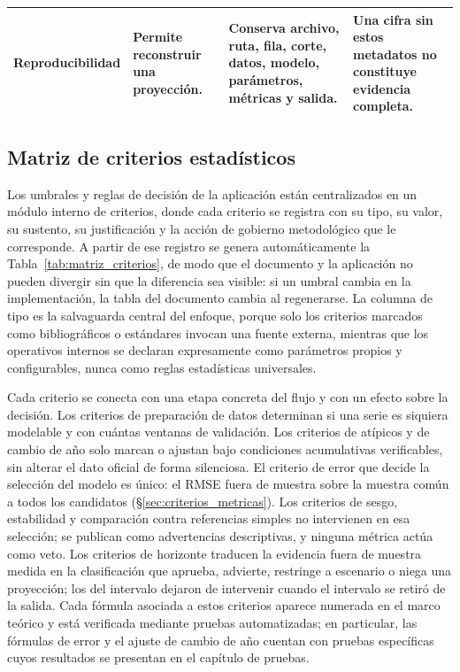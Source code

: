 \documentclass[12pt,letterpaper]{article}
\begin{document}
\begin{landscape}
\begin{table}[H]
\begin{adjustbox}{max width=\linewidth,max totalheight=0.84\textheight}
\begin{tabularx}{\linewidth}{@{}p{3.1cm}YYY@{}}
Reproducibilidad & Permite reconstruir una proyección. & Conserva archivo, ruta, fila, corte, datos, modelo, parámetros, métricas y salida. & Una cifra sin estos metadatos no constituye evidencia completa. \\
\bottomrule
\end{tabularx}
\end{adjustbox}
\end{table}
\end{landscape}

\subsection{Matriz de criterios estadísticos}
\label{sec:matriz_criterios}

Los umbrales y reglas de decisión de la aplicación están centralizados en un módulo interno de criterios, donde cada criterio se registra con su tipo, su valor, su sustento, su justificación y la acción de gobierno metodológico que le corresponde. A partir de ese registro se genera automáticamente la Tabla~\ref{tab:matriz_criterios}, de modo que el documento y la aplicación no pueden divergir sin que la diferencia sea visible: si un umbral cambia en la implementación, la tabla del documento cambia al regenerarse. La columna de tipo es la salvaguarda central del enfoque, porque solo los criterios marcados como bibliográficos o estándares invocan una fuente externa, mientras que los operativos internos se declaran expresamente como parámetros propios y configurables, nunca como reglas estadísticas universales.

Cada criterio se conecta con una etapa concreta del flujo y con un efecto sobre la decisión. Los criterios de preparación de datos determinan si una serie es siquiera modelable y con cuántas ventanas de validación. Los criterios de atípicos y de cambio de año solo marcan o ajustan bajo condiciones acumulativas verificables, sin alterar el dato oficial de forma silenciosa. El criterio de error que decide la selección del modelo es único: el RMSE fuera de muestra sobre la muestra común a todos los candidatos (§\ref{sec:criterios_metricas}). Los criterios de sesgo, estabilidad y comparación contra referencias simples no intervienen en esa selección; se publican como advertencias descriptivas, y ninguna métrica actúa como veto. Los criterios de horizonte traducen la evidencia fuera de muestra medida en la clasificación que aprueba, advierte, restringe a escenario o niega una proyección; los del intervalo dejaron de intervenir cuando el intervalo se retiró de la salida. Cada fórmula asociada a estos criterios aparece numerada en el marco teórico y está verificada mediante pruebas automatizadas; en particular, las fórmulas de error y el ajuste de cambio de año cuentan con pruebas específicas cuyos resultados se presentan en el capítulo de pruebas.
\end{document}
